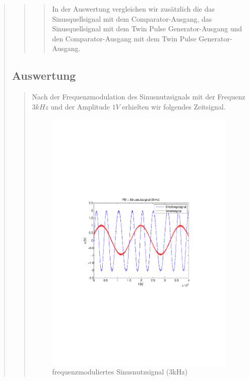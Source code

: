 \begin{quote}
\begin{quote}
\begin{quote}
        In der Auswertung vergleichen wir zusätzlich die das Sinusquellsignal
        mit dem Comparator-Ausgang, das Sinusquellsignal mit dem Twin Pulse
        Generator-Ausgang und den Comparator-Ausgang mit dem Twin Pulse
        Generator-Ausgang.
         
        \end{quote}
        
    \end{quote}
    
    \subsection{Auswertung}
    \begin{quote}
    
        Nach der Frequenzmodulation des Sinusnutzsignals mit der Frequenz 
        $3 kHz$ und der Amplitude $1 V$ erhielten wir folgendes Zeitsignal.
    	
             \begin{figure}[H] \centering
                    \includegraphics[scale=0.5, trim = 2cm 6.5cm 1.5cm 8.5cm,
                    clip]{./Bilder/fm_sinus(3kHz)}
                        \caption{frequenzmoduliertes Sinusnutzsignal (3kHz)}
                \end{figure}
        

\end{quote}
\end{quote}
